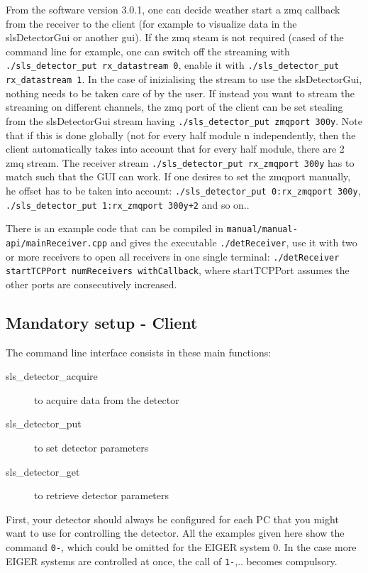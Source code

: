 \documentclass{article}
\begin{document}
From the software version 3.0.1, one can decide weather start a zmq callback from the receiver to the client (for example to visualize data in the slsDetectorGui or another gui). If the zmq steam is not required (cased of the command line for example, one can switch off the streaming with {\tt{./sls\_detector\_put rx\_datastream 0}}, enable it with {\tt{./sls\_detector\_put rx\_datastream 1}}. In the case of inizialising the stream to use the slsDetectorGui, nothing needs to be taken care of by the user. If instead you want to stream the streaming on different channels, the zmq port of the client can be set stealing from the slsDetectorGui stream having {\tt{./sls\_detector\_put zmqport 300y}}. Note that if this is done globally (not for every half module n independently, then the client automatically takes into account that for every half module, there are 2 zmq stream. The receiver stream {\tt{./sls\_detector\_put rx\_zmqport 300y}} has to match such that the GUI can work. 
If one desires to set the zmqport manually, he offset has to be taken into account: {\tt{./sls\_detector\_put 0:rx\_zmqport 300y}}, {\tt{./sls\_detector\_put 1:rx\_zmqport 300y+2}} and so on..

There is an example code that can be compiled in {\tt{manual/manual-api/mainReceiver.cpp}} and gives the executable {\tt{./detReceiver}}, use it with two or more receivers to open all receivers in one single terminal: {\tt{./detReceiver startTCPPort numReceivers withCallback}}, where startTCPPort assumes the other ports are consecutively increased.

\subsection{Mandatory setup - Client}

The command line interface consists in these main functions:
\begin{description}
\item[sls\_detector\_acquire] to acquire data from the detector
\item[sls\_detector\_put] to set detector parameters
\item[sls\_detector\_get] to retrieve detector parameters
\end{description}

First, your detector should always be configured for each PC that you might want to use for controlling the detector. All the examples given here show the command {\tt{0-}}, which could be omitted for the EIGER system $0$. In the case more EIGER systems are controlled at once, the call of {\tt{1-}},.. becomes compulsory. 
\end{document}
